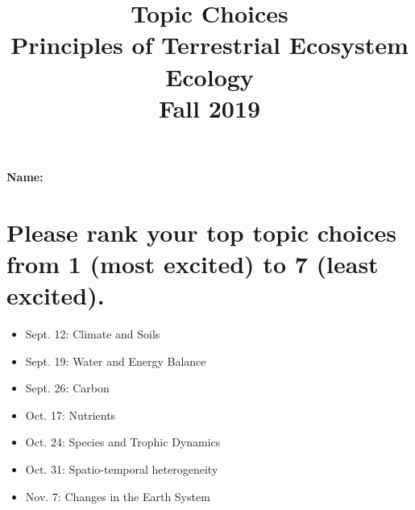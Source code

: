 \documentclass[12pt, notitlepage]{article}   	%
\title{
	\textbf{
		Topic Choices
	} \\
	\large{Principles of Terrestrial Ecosystem Ecology} \\
	\large{Fall 2019}
}
\date{\vspace{-5ex}}
\begin{document}
{\selectfont %

\maketitle

\Large{\textbf{Name:} \underline{\hspace{10cm}}}

\section{Please rank your top topic choices from 1 (most excited) to 7 (least excited).}
\begin{itemize}
	\item{\underline{\hspace{1cm}} Sept. 12: Climate and Soils}
	\item{\underline{\hspace{1cm}} Sept. 19: Water and Energy Balance}
	\item{\underline{\hspace{1cm}} Sept. 26: Carbon}
	\item{\underline{\hspace{1cm}} Oct. 17: Nutrients}
	\item{\underline{\hspace{1cm}} Oct. 24: Species and Trophic Dynamics}
	\item{\underline{\hspace{1cm}} Oct. 31: Spatio-temporal heterogeneity}
	\item{\underline{\hspace{1cm}} Nov. 7: Changes in the Earth System}
\end{itemize}

} %
\end{document}
